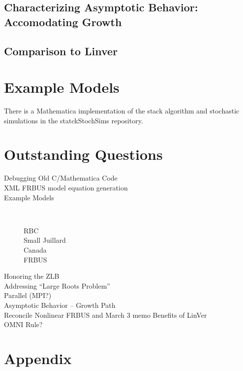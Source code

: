 \documentclass[12pt]{article}
\begin{document}
\subsection{Characterizing Asymptotic Behavior:  Accomodating Growth}
\label{sec:char-asympt-behav}

\subsection{Comparison to Linver}
\label{sec:comparison-linver}



\section{Example Models}
\label{sec:example-models}

There is a Mathematica implementation of the stack algorithm
 and stochastic simulations in the statckStochSims repository.  

\newpage
\section{Outstanding Questions}
\begin{description}
\item[Debugging Old C/Mathematica Code] 
\item[XML FRBUS model equation generation] 
\item[Example Models] \ 
  \begin{description}
  \item[RBC] 
  \item[Small Juillard] 
  \item[Canada] 
  \item[FRBUS] 
  \end{description}
\item[Honoring the ZLB] 
\item[Addressing ``Large Roots Problem''] 
\item[Parallel  (MPI?)] 
\item[Asymptotic Behavior -- Growth Path] 
\item[Reconcile Nonlinear FRBUS and March 3 memo Benefits of LinVer] 
\item[OMNI Rule?] 
\end{description}




\newpage
\appendix

\section{Appendix}
\label{sec:app}
\end{document}
